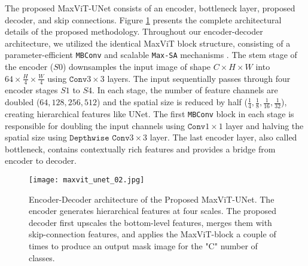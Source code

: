 \documentclass{article}
\begin{document}
The proposed MaxViT-UNet consists of an encoder, bottleneck layer, proposed decoder, and skip connections. Figure \ref{fig:maxvit-unet-architecture} presents the complete architectural details of the proposed methodology. Throughout our encoder-decoder architecture, we utilized the identical MaxViT block structure, consisting of a parameter-efficient \texttt{MBConv} \cite{sandler2018mobilenetv2} and scalable \texttt{Max-SA} mechanisms \cite{tu2022maxvit}. The stem stage of the encoder (\(S0\)) downsamples the input image of shape \(C \times H \times W\) into \(64 \times \frac{H}{4} \times \frac{W}{4}\) using \(\texttt{Conv}3\times3\) layers. The input sequentially passes through four encoder stages \(S1\) to \(S4\). In each stage, the number of feature channels are doubled (\(64, 128, 256, 512\)) and the spatial size is reduced by half (\(\frac{1}{4}, \frac{1}{8}, \frac{1}{16}, \frac{1}{32}\)), creating hierarchical features like UNet. The first \texttt{MBConv} block in each stage is responsible for doubling the input channels using \(\texttt{Conv}1\times1\) layer and halving the spatial size using \(\texttt{Depthwise Conv}3\times3\) layer. The last encoder layer, also called bottleneck, contains contextually rich features and provides a bridge from encoder to decoder.

\begin{figure}[ht!]
  \centering
  \texttt{[image: maxvit\_unet\_02.jpg]}
  \caption{Encoder-Decoder architecture of the Proposed MaxViT-UNet. The encoder generates hierarchical features at four scales. The proposed decoder first upscales the bottom-level features, merges them with skip-connection features, and applies the MaxViT-block a couple of times to produce an output mask image for the "C" number of classes.}
  \label{fig:maxvit-unet-architecture}
\end{figure}
\end{document}
